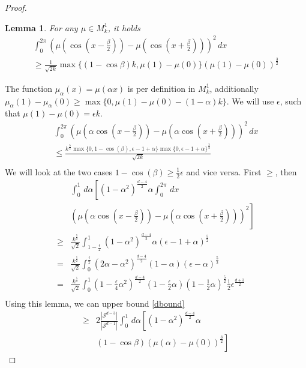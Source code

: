 \documentclass[twoside]{article} \usepackage{aistats2017}
\newtheorem{lemma}[theorem]{Lemma}
\begin{document}
\begin{proof}
\begin{lemma}
        For any $\mu\in M_k^1$, it holds
        \begin{align*}
            \int_{0}^{2\pi}\left(\mu(\cos(x-\frac{\beta}{2}))-\mu( \cos(x+\frac{\beta}{2}))\right)^2\, dx\\
            \geq \frac{1}{\sqrt{2k}}\max\{(1-\cos{\beta})k,\mu(1)-\mu(0)\}(\mu(1)-\mu(0))^\frac{3}{2}
        \end{align*}
    \end{lemma}
    The function $\mu_\alpha(x)=\mu(\alpha x)$ is per definition in $M_k^1$, additionally $\mu_\alpha(1)-\mu_\alpha(0)\geq \max\{0,\mu(1)-\mu(0)-(1-\alpha)k\}$. We will use $\epsilon$, such that $\mu(1)-\mu(0)=\epsilon k$.
    \begin{align*}
        \int_{0}^{2\pi}\left(\mu(\alpha\cos(x-\frac{\beta}{2}))-\mu(\alpha \cos(x+\frac{\beta}{2}))\right)^2\,dx\\
        \leq \frac{k^\frac{5}{2}\max\{0,1-\cos(\beta),\epsilon-1+\alpha\}\max\{0,\epsilon-1+\alpha\}^{\frac{3}{2}}}{\sqrt{2k}}\\
    \end{align*}
    We will look at the two cases $1-\cos(\beta)\geq \frac{1}{2}\epsilon$ and vice versa. First $\geq$, then 
    \begin{align*}
        &\int_{0}^{1}\,d\alpha\left[(1-\alpha^2)^{\frac{d-4}{2}}\alpha\int_{0}^{2\pi}\, dx\right.\nonumber\\
    &\left.\left(\mu(\alpha\cos(x-\frac{\beta}{2}))-\mu(\alpha \cos(x+\frac{\beta}{2}))\right)^2\right]\\
    \geq& \frac{k^\frac{5}{2}}{\sqrt{2}}\int_{1-\frac{\epsilon}{2}}^1 (1-\alpha^2)^{\frac{d-4}{2}}\alpha
    (\epsilon-1+\alpha)^\frac{5}{2}\\
    =&\frac{k^\frac{5}{2}}{\sqrt{2}}\int_{0}^{\frac{\epsilon}{2}} (2\alpha-\alpha^2)^{\frac{d-4}{2}}(1-\alpha)
    (\epsilon-\alpha)^\frac{5}{2}\\
    =&\frac{k^\frac{5}{2}}{\sqrt{2}}\int_{0}^{1} (1-\frac{\epsilon}{4}\alpha^2)^{\frac{d-4}{2}}(1-\frac{\epsilon}{2}\alpha)
    (1-\frac{1}{2}\alpha)^\frac{5}{2}\frac{1}{2}\epsilon^{\frac{d+3}{2}}\\
    \end{align*}
    Using this lemma, we can upper bound \eqref{dbound} 
    \begin{align*}
        \geq&2\frac{|\mathcal{S}^{d-3}|}{|\mathcal{S}^{d-1}|}\int_{0}^{1}\,d\alpha\left[(1-\alpha^2)^{\frac{d-4}{2}}\alpha\right.\\
    &\left.(1-\cos{\beta})(\mu(\alpha)-\mu(0))^\frac{3}{2}\right]

\end{align*}
\end{proof}
\end{document}
